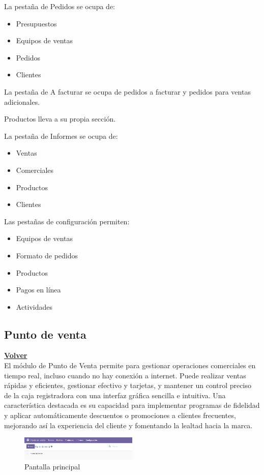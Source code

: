 \documentclass[a4paper,12pt]{article}
\begin{document}
La pestaña de Pedidos se ocupa de:
\begin{itemize}
    \item Presupuestos
    \item Equipos de ventas
    \item Pedidos
    \item Clientes
\end{itemize}

La pestaña de A facturar se ocupa de pedidos a facturar y pedidos para ventas adicionales.

Productos lleva a su propia sección.

La pestaña de Informes se ocupa de:
\begin{itemize}
    \item Ventas
    \item Comerciales
    \item Productos
    \item Clientes
\end{itemize}

Las pestañas de configuración permiten:
\begin{itemize}
    \item Equipos de ventas
    \item Formato de pedidos
    \item Productos
    \item Pagos en línea
    \item Actividades
\end{itemize}

\subsection{Punto de venta}
\hyperlink{anchor-indice}{\textbf{Volver}}\\

El módulo de Punto de Venta permite para gestionar operaciones comerciales en tiempo real, incluso cuando no hay conexión a internet. Puede realizar ventas rápidas y eficientes, gestionar efectivo y tarjetas, y mantener un control preciso de la caja registradora con una interfaz gráfica sencilla e intuitiva.
Una característica destacada es su capacidad para implementar programas de fidelidad y aplicar automáticamente descuentos o promociones a clientes frecuentes, mejorando así la experiencia del cliente y fomentando la lealtad hacia la marca.

\begin{figure}[h!]
    \centering
    \includegraphics[width=0.5\textwidth]{pr2odoo48-pantallaPrincipal.png}
    \caption{Pantalla principal}
\end{figure}
\FloatBarrier
\end{document}
